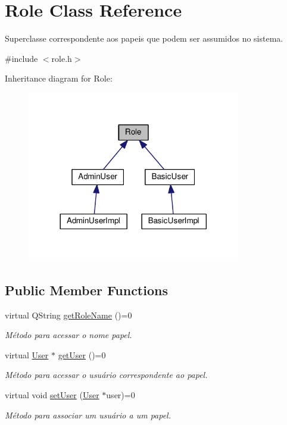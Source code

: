 \hypertarget{classRole}{}\section{Role Class Reference}
\label{classRole}


Superclasse correspondente aos papeis que podem ser assumidos no sistema.  




{\ttfamily \#include $<$role.\+h$>$}



Inheritance diagram for Role\+:
\nopagebreak
\begin{figure}[H]
\begin{center}
\leavevmode
\includegraphics[width=264pt]{d3/d43/classRole__inherit__graph}
\end{center}
\end{figure}
\subsection*{Public Member Functions}
\begin{DoxyCompactItemize}
\item 
virtual Q\+String \hyperlink{classRole_a295daeaed997d10f9bd3d03e972318c1}{get\+Role\+Name} ()=0
\begin{DoxyCompactList}\small\item\em Método para acessar o nome papel. \end{DoxyCompactList}\item 
virtual \hyperlink{classUser}{User} $\ast$ \hyperlink{classRole_abad7de00bc38b11eaae8a79069773221}{get\+User} ()=0
\begin{DoxyCompactList}\small\item\em Método para acessar o usuário correspondente ao papel. \end{DoxyCompactList}\item 
virtual void \hyperlink{classRole_ab5581d91192fa578070e80b0247dde5a}{set\+User} (\hyperlink{classUser}{User} $\ast$user)=0
\begin{DoxyCompactList}\small\item\em Método para associar um usuário a um papel. \end{DoxyCompactList}\end{DoxyCompactItemize}


